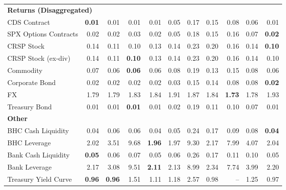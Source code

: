 \begin{table}[htbp]
\begin{tabular}{@{}lrrrrrrrrrr@{}}
\midrule
\multicolumn{11}{l}{\textbf{Returns (Disaggregated)}} \\
CDS Contract & \textbf{0.01} & 0.01 & 0.01 & 0.01 & 0.05 & 0.17 & 0.15 & 0.08 & 0.06 & 0.01 \\
SPX Options Contracts & 0.02 & 0.02 & 0.03 & 0.02 & 0.05 & 0.18 & 0.15 & 0.16 & 0.07 & \textbf{0.02} \\
CRSP Stock & 0.14 & 0.11 & 0.10 & 0.13 & 0.14 & 0.23 & 0.20 & 0.16 & 0.14 & \textbf{0.10} \\
CRSP Stock (ex-div) & 0.14 & 0.11 & \textbf{0.10} & 0.13 & 0.14 & 0.23 & 0.20 & 0.16 & 0.14 & 0.10 \\
Commodity & 0.07 & 0.06 & \textbf{0.06} & 0.06 & 0.08 & 0.19 & 0.13 & 0.15 & 0.08 & 0.06 \\
Corporate Bond & 0.02 & 0.02 & 0.02 & 0.02 & 0.03 & 0.15 & 0.14 & 0.08 & 0.08 & \textbf{0.02} \\
FX & 1.79 & 1.79 & 1.83 & 1.84 & 1.91 & 1.87 & 1.84 & \textbf{1.73} & 1.78 & 1.93 \\
Treasury Bond & 0.01 & 0.01 & \textbf{0.01} & 0.01 & 0.02 & 0.19 & 0.11 & 0.10 & 0.07 & 0.01 \\
\midrule
\multicolumn{11}{l}{\textbf{Other}} \\
BHC Cash Liquidity & 0.04 & 0.06 & 0.06 & 0.04 & 0.05 & 0.24 & 0.17 & 0.09 & 0.08 & \textbf{0.04} \\
BHC Leverage & 2.02 & 3.51 & 9.68 & \textbf{1.96} & 1.97 & 9.30 & 2.17 & 7.99 & 4.07 & 2.04 \\
Bank Cash Liquidity & \textbf{0.05} & 0.06 & 0.07 & 0.05 & 0.06 & 0.26 & 0.17 & 0.11 & 0.10 & 0.05 \\
Bank Leverage & 2.17 & 3.08 & 9.51 & \textbf{2.11} & 2.13 & 8.99 & 2.34 & 7.74 & 3.99 & 2.20 \\
Treasury Yield Curve & \textbf{0.96} & \textbf{0.96} & 1.51 & 1.11 & 1.18 & 2.57 & 0.98 & -- & 1.25 & 0.97 \\
\bottomrule
\end{tabular}
\vspace{0.1cm}

\end{table}
